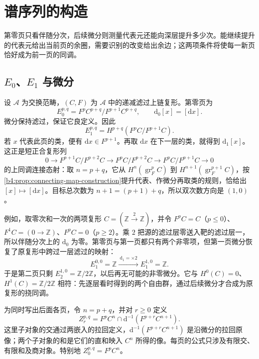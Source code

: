 
\section{谱序列的构造}
\label{b4:sec:1402}

第零页只看伴随分次，后续微分则测量代表元还能向深层提升多少次。能继续提升的代表元给出当前页的余圈，需要识别的改变给出余边；这两项条件将使每一新页恰好成为前一页的同调。

%
%

\subsection{\texorpdfstring{\(E_0\)、\(E_1\) 与微分}{E0、E1 与微分}}
\label{b4:subsec:1402:01}

设 \(\mathcal A\) 为交换范畴，\((C,F)\) 为 \(\mathcal A\) 中的递减滤过上链复形。第零页为
\[
	E_0^{p,q}=F^pC^{p+q}/F^{p+1}C^{p+q},\qquad \mathrm{d}_0[x]=[\mathrm{d}x].
\]
微分保持滤过，保证它良定义。因此
\[
	E_1^{p,q}=H^{p+q}(F^pC/F^{p+1}C).
\]
若 \(x\) 代表此页的类，便有 \(\mathrm{d}x\in F^{p+1}\)。再取 \(\mathrm{d}x\) 在下一层的类，就得到 \(\mathrm{d}_1[x]\)。这正是短正合复形列
\[
	0\longrightarrow F^{p+1}C/F^{p+2}C \longrightarrow F^pC/F^{p+2}C \longrightarrow F^pC/F^{p+1}C\longrightarrow0
\]
的上同调连接态射：取 \(n=p+q\)，它从 \(H^n(\operatorname{gr}_F^pC)\) 到 \(H^{n+1}(\operatorname{gr}_F^{p+1}C)\)，按\cref{b4:prop:connecting-map-construction}提升代表、作微分再取类的规则，恰给出 \([x]\mapsto[\mathrm d x]\)。目标总次数为 \(n+1=(p+1)+q\)，所以双次数方向是 \((1,0)\)。

\ProseParagraphBreak
例如，取零次和一次的两项复形 \(C=(\mathbb Z\xrightarrow{2}\mathbb Z)\)，并令 \(F^pC=C\)（\(p\le0\)）、\(F^1C=(0\to\mathbb Z)\)、\(F^pC=0\)（\(p\ge2\)）。乘 \(2\) 把源的滤过层零送入靶的滤过层一，所以伴随分次上的 \(\mathrm{d}_0\) 为零。第零页与第一页都只有两个非零项，但第一页微分恢复了原复形中跨过一层滤过的映射：
\[
	E_1^{0,0}=\mathbb Z\xrightarrow{\ \mathrm{d}_1=\times2\ } E_1^{1,0}=\mathbb Z.
\]
于是第二页只剩 \(E_2^{1,0}=\mathbb Z/2\mathbb Z\)，以后再无可能的非零微分。它与 \(H^0(C)=0\)、\(H^1(C)=\mathbb Z/2\mathbb Z\) 相符：先逐层看时得到的两个自由群，通过后续微分才合成为原复形的挠同调。

\ProseParagraphBreak
为同时写出后面各页，令 \(n=p+q\)，并对 \(r\ge0\) 定义
\[
	Z_r^{p,q}=F^pC^n\cap \mathrm{d}^{-1}(F^{p+r}C^{n+1}).
\]
这里子对象的交通过两嵌入的拉回定义，\(\mathrm d^{-1}(F^{p+r}C^{n+1})\) 是沿微分的拉回原像；两个子对象的和是它们的直和映入 \(C^n\) 所得的像。每页的公式只涉及有限交、有限和及商对象。特别地 \(Z_0^{p,q}=F^pC^n\)。

